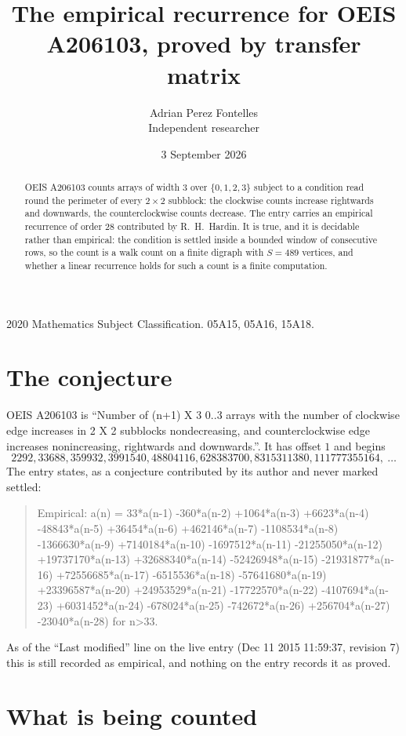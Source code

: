 \documentclass[11pt,a4paper]{article}
\title{The empirical recurrence for OEIS A206103, proved by transfer matrix}
\author{Adrian Perez Fontelles\\ \small Independent researcher}
\date{3 September 2026}
\theoremstyle{plain}
\theoremstyle{definition}
\begin{document}
\maketitle

\begin{abstract}
OEIS A206103 counts arrays of width $3$ over $\{0,1,2,3\}$ subject to a condition read round the
perimeter of every $2\times2$ subblock: the clockwise counts increase rightwards and downwards, the counterclockwise counts decrease. The entry carries an empirical recurrence of
order $28$ contributed by R.~H.~Hardin. It is true, and it is decidable rather than
empirical: the condition is settled inside a bounded window of consecutive rows, so the
count is a walk count on a finite digraph with $S=489$ vertices, and whether a linear
recurrence holds for such a count is a finite computation.
\end{abstract}

\noindent\small 2020 Mathematics Subject Classification. 05A15, 05A16, 15A18.\normalsize

\section{The conjecture}

OEIS A206103 is ``Number of (n+1) X 3 0..3 arrays with the number of clockwise edge increases in 2 X 2 subblocks nondecreasing, and counterclockwise edge increases nonincreasing, rightwards and downwards.''. It has offset $1$ and begins
\[
2292, 33688, 359932, 3991540, 48804116, 628383700, 8315311380, 111777355164,\ \dots
\]
The entry states, as a conjecture contributed by its author and never marked settled:
\begin{quote}
Empirical: a(n) = 33*a(n-1) -360*a(n-2) +1064*a(n-3) +6623*a(n-4) -48843*a(n-5) +36454*a(n-6) +462146*a(n-7) -1108534*a(n-8) -1366630*a(n-9) +7140184*a(n-10) -1697512*a(n-11) -21255050*a(n-12) +19737170*a(n-13) +32688340*a(n-14) -52426948*a(n-15) -21931877*a(n-16) +72556685*a(n-17) -6515536*a(n-18) -57641680*a(n-19) +23396587*a(n-20) +24953529*a(n-21) -17722570*a(n-22) -4107694*a(n-23) +6031452*a(n-24) -678024*a(n-25) -742672*a(n-26) +256704*a(n-27) -23040*a(n-28) for n>33.
\end{quote}
As of the ``Last modified'' line on the live entry (Dec 11 2015 11:59:37, revision 7) this is still
recorded as empirical, and nothing on the entry records it as proved.

\section{What is being counted}
\end{document}
